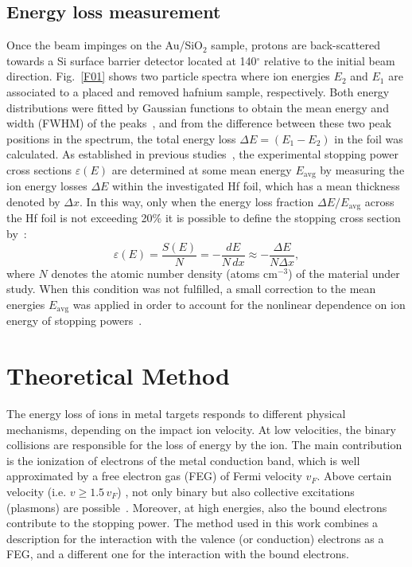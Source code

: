 \documentclass[aps,pra,reprint,groupedaddress]{revtex4-1}
\begin{document}
\subsection{Energy loss measurement}
Once the beam impinges on the Au/SiO$_2$ sample, protons are back-scattered towards a Si surface barrier detector located at 140$^{\circ}$ relative to the initial beam direction. Fig.~\ref{F01} shows two particle spectra where ion energies $E_2$ and $E_1$ are associated to a placed and removed hafnium sample, respectively. Both energy distributions were fitted by Gaussian functions to obtain the mean energy and width (FWHM) of the peaks~\cite{Sun01}, and from the difference between these two peak positions in the spectrum, the total energy loss $\Delta E = (E_1 - E_2)$ in the foil was calculated. As established in previous studies~\cite{Miranda01,Damache02}, the experimental stopping power cross sections $\varepsilon (E) $ are determined at some mean energy $E_{\mathrm{avg}}$ by measuring the ion energy losses $\Delta E$ within the investigated Hf foil, which has a mean thickness denoted by $\Delta x$. In this way, only when the energy loss fraction $\Delta E/E_{\mathrm{avg}}$ across the Hf foil is not exceeding 20\%
it is possible to define the stopping cross section by~\cite{Raisanen01,Schulz01}:
\begin{equation}\label{eq:stcross}
 \varepsilon(E)=\frac{S(E)}{N}=-\frac{dE}{N\,dx}\approx-\frac{\Delta E}{N\Delta x},
\end{equation}
where $N$ denotes the atomic number density (atoms cm$^{-3}$) of the material under study. When this condition was not fulfilled, a small correction to the mean energies $E_{\mathrm{avg}}$ was applied in order to account for the nonlinear dependence on ion energy of stopping powers~\cite{Chilton,Rajatora}.

\section{Theoretical Method} \label{theory}
The energy loss of ions in metal targets responds to different physical mechanisms, depending on the impact ion velocity. At low velocities, the binary collisions are responsible for the loss of energy by the ion. The main contribution is the ionization of electrons of the metal conduction band, which is well approximated by a free electron gas (FEG) of Fermi velocity $v_F$. Above certain velocity (i.e. $v\geq 1.5\,v_F$) , not only binary but also collective excitations (plasmons) are possible~\cite{mon17}. Moreover, at high energies, also the bound electrons contribute to the stopping power. The method used in this work combines a description for the interaction with the valence (or conduction) electrons as a FEG, and a different one for the interaction with the bound electrons.
\end{document}
